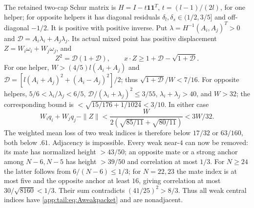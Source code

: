 The retained two-cap Schur matrix is
$H=I-t\mathbf1\mathbf1^T$, $t=(l-1)/(2l)$, for one helper;
for opposite helpers it has diagonal residuals
$\delta_l,\delta_s\in(1/2,3/5]$ and off-diagonal $-1/2$.
It is positive with positive inverse. Put
$\lambda=H^{-1}(A_i,A_j)^T>0$ and
$\mathcal D=A_i\lambda_i+A_j\lambda_j$.
Its actual mixed point has positive displacement
$Z=W_i\omega_i+W_j\omega_j$, and
\[
 Z^2=\mathcal D(1+\mathcal D),\qquad
 x\cdot Z\ge1+\mathcal D-\sqrt{1+\mathcal D}.
\]
For one helper, $W>(4/5)l(A_i+A_j)$ and
$\mathcal D=[l(A_i+A_j)^2+(A_i-A_j)^2]/2$;
thus $\sqrt{1+\mathcal D}/W<7/16$.
For opposite helpers, $5/6<\lambda_i/\lambda_j<6/5$,
$\mathcal D/(\lambda_i+\lambda_j)^2\le3/55$,
$\lambda_i+\lambda_j>40$, and $W>32$;
the corresponding bound is $<\sqrt{15/176+1/1024}<3/10$.
In either case
\[
 W_iq_i+W_jq_j-\|Z\|
 <\frac{W}{2(\sqrt{85/11}+\sqrt{80/11})}<3W/32.
\]
The weighted mean loss of two weak indices is therefore below
$17/32$ or $63/160$, both below $.61$. Adjacency is impossible.
Every weak near-$4$ can now be removed: its mate has normalized
height $>43/50$; an opposite mate or a strong anchor among
$N-6,N-5$ has height $>39/50$ and correlation at most $1/3$.
For $N\ge24$ the latter follows from $6/(N-6)\le1/3$;
for $N=22,23$ the mate index is at most five and the opposite
anchor at least $16$, giving correlation at most
$30/\sqrt{8160}<1/3$.
Their sum contradicts $(41/25)^2>8/3$.
Thus all weak central indices have \eqref{app:tail:eq:Aweakpacket} and
are nonadjacent.

